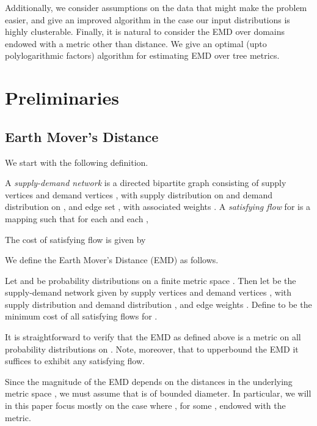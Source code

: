 \documentclass[11pt]{article}
\begin{document}
Additionally, we consider assumptions on the data that might make the problem
easier, and give an improved algorithm in the case our input distributions is highly
clusterable. Finally, it is natural to consider the EMD over domains endowed with a
metric other than  distance. We give an optimal (upto polylogarithmic factors)
algorithm for estimating EMD over tree metrics.


\section{Preliminaries}

\subsection{Earth Mover's Distance}

We start with the following definition.

\begin{definition}
	A {\em supply-demand network} is a directed bipartite graph 
	consisting of supply vertices  and demand vertices , with supply
	distribution  on  and demand distribution  on , and edge set
	,  with associated weights . A {\em satisfying flow} for  is a
	mapping  such that for each  and each ,
	
	The cost of satisfying flow  is given by
		
\end{definition}

We define the Earth Mover's Distance (EMD) as follows.

\begin{definition}\label{def:flow}
	Let  and  be probability distributions on a finite metric space .
	Then let  be the supply-demand network given by supply vertices
	 and demand vertices , with supply distribution
	 and demand distribution , and
	edge weights . Define  to be the minimum
	cost of all satisfying flows for .
\end{definition}

It is straightforward to verify that the EMD as defined above is a metric on all
probability distributions on . Note, moreover, that to upperbound the EMD it
suffices to exhibit any satisfying flow. 

Since the magnitude of the EMD depends on the distances in the underlying metric
space , we must assume that  is of bounded diameter. In particular, we will in
this paper focus mostly on the case where , for some ,
endowed with the  metric.
\end{document}

